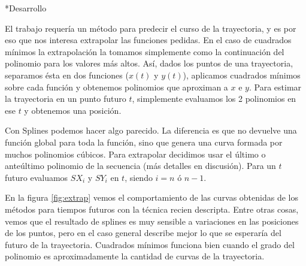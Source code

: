 \documentclass[12pt,titlepage]{article}
\newenvironment{usection}[1]{\newpage\begin{section}*{#1}	\addcontentsline{toc}{section}{#1}}{\end{section}}
\begin{document}
\begin{usection}{Desarrollo}
		El trabajo requería un método para predecir el curso de la trayectoria, y es por eso que nos interesa extrapolar las funciones pedidas.
		En el caso de cuadrados mínimos la extrapolación la tomamos simplemente como la continuación del polinomio para los valores más altos.
		Así, dados los puntos de una trayectoria, separamos ésta en dos funciones ($x(t)$ y $y(t)$), aplicamos cuadrados mínimos sobre cada función y obtenemos polinomios que aproximan a $x$ e $y$.
		Para estimar la trayectoria en un punto futuro $t$, simplemente evaluamos los 2 polinomios en ese $t$ y obtenemos una posición.
		
		Con Splines podemos hacer algo parecido. La diferencia es que no devuelve una función global para toda la función, sino que genera una curva formada por muchos polinomios cúbicos.
		Para extrapolar decidimos usar el último o anteúltimo polinomio de la secuencia (más detalles en discusión). Para un $t$ futuro evaluamos $SX_i$ y $SY_i$ en $t$, siendo $i=n$ ó $n-1$.
		
		En la figura \ref{fig:extrap} vemos el comportamiento de las curvas obtenidas de los métodos para tiempos futuros con la técnica recien descripta.
		Entre otras cosas, vemos que el resultado de splines es muy sensible a variaciones en las posiciones de los puntos, pero en el caso general describe mejor lo que se esperaría del futuro de la trayectoria.
		Cuadrados mínimos funciona bien cuando el grado del polinomio es aproximadamente la cantidad de curvas de la trayectoria.


\end{usection}
\end{document}
